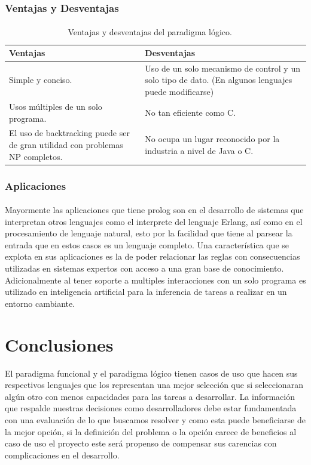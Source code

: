 \documentclass[12pt]{article}
\begin{document}
		\subsubsection{Ventajas y Desventajas}
		\paragraph{}
		\begin{table}[h!]
			\begin{center}
				\label{tab:lp_advantages_disadvantages}
				\begin{tabular}{|C{7cm} |C{7cm} |}
					\textbf{Ventajas} & \textbf{Desventajas} \\
					\hline
					Simple y conciso. & Uso de un solo mecanismo de control y un solo tipo de dato. (En algunos lenguajes puede modificarse) \\
					\hline
					Usos múltiples de un solo programa.& No tan eficiente como C.\\
					\hline
				El uso de backtracking puede ser de gran utilidad con problemas NP completos.& No ocupa un lugar reconocido por la industria a nivel de Java o C.\\
				\end{tabular}
				\caption{Ventajas y desventajas del paradigma lógico. ~\cite{DBLP:journals/corr/cs-PL-0107013}~\cite{introductioin_lp}}
			\end{center}
		\end{table}
		\subsubsection{Aplicaciones}
		\paragraph{}
		Mayormente las aplicaciones que tiene prolog son en el desarrollo de sistemas que interpretan otros lenguajes como el interprete del lenguaje Erlang, así como en el procesamiento de lenguaje natural, esto por la facilidad que tiene al parsear la entrada que en estos casos es un lenguaje completo. Una característica que se explota en sus aplicaciones es la de poder relacionar las reglas con consecuencias utilizadas en sistemas expertos con acceso a una gran base de conocimiento. Adicionalmente al tener soporte a multiples interacciones con un solo programa es utilizado en inteligencia artificial para la inferencia de tareas a realizar en un entorno cambiante. ~\cite{quora_lp}
		\section{Conclusiones}\label{conclusiones}
	El paradigma funcional y el paradigma lógico tienen casos de uso que hacen sus respectivos lenguajes que los representan una mejor selección que si seleccionaran algún otro con menos capacidades para las tareas a desarrollar. La información que respalde nuestras decisiones como desarrolladores debe estar fundamentada con una evaluación de lo que buscamos resolver y como esta puede beneficiarse de la mejor opción, si la definición del problema o la opción carece de beneficios al caso de uso el proyecto este será propenso de compensar sus carencias con complicaciones en el desarrollo. 
\end{document}
